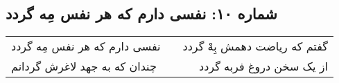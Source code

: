 \begin{center}
\section*{شماره ۱۰: نفسی دارم که هر نفس مِه گردد}
\label{sec:010}
\begin{longtable}{l p{0.5cm} r}
نفسی دارم که هر نفس مِه گردد
&&
گفتم که ریاضت دهمش بِهْ گردد
\\
چندان که به جهد لاغرش گردانم
&&
از یک سخن دروغ فربه گردد
\\
\end{longtable}
\end{center}
